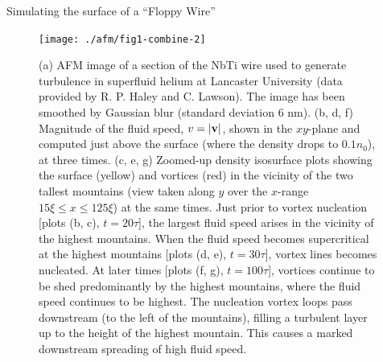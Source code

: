 \begin{chapter}{\label{cha:afm}Simulating the surface of a ``Floppy Wire''}
\begin{figure}
\centering
\texttt{[image: ./afm/fig1-combine-2]}%
\caption{(a) AFM image of a section of the NbTi wire used to generate turbulence in superfluid helium at Lancaster University (data provided by R. P. Haley and C. Lawson).  The image has been smoothed by Gaussian blur (standard deviation 6 nm).   
(b, d, f) Magnitude of the fluid speed, $v=|{\bf v}|$, shown in the $xy$-plane and computed just above the surface (where the
density drops to $0.1 n_0$), at three times.  (c, e, {g}) Zoomed-up density isosurface plots showing the surface (yellow) and vortices (red) in the vicinity of the two tallest mountains (view taken along $y$ over the $x$-range $15 \xi \leq x \leq 125 \xi$) at the same times.  Just prior to vortex nucleation [plots (b, c), $t=20 \tau$], the largest fluid speed arises in the vicinity of the highest mountains.  When the fluid speed becomes supercritical at the highest mountains [plots (d, e), $t=30 \tau$], vortex lines becomes nucleated.  At later times [plots (f, g), $t=100 \tau$], vortices continue to be shed predominantly by the highest mountains, where the fluid speed continues to be highest.  
The nucleation vortex loops pass downstream (to the left of the mountains), filling a turbulent layer up to the height of the highest mountain.  This causes a marked downstream spreading of high fluid speed. 
}
\label{fig1}
\end{figure}

\end{chapter}
